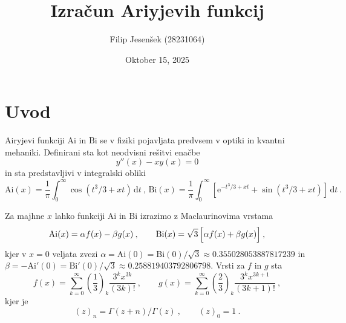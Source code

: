\documentclass{article}
\author{Filip Jesenšek (28231064)}
\date{Oktober 15, 2025}
\newcommand{\Ai}{\mathrm{Ai}}
\newcommand{\Bi}{\mathrm{Bi}}
\newcommand{\dd}{\,\mathrm{d}}
\theoremstyle{definition}
\theoremstyle{plain}
\numberwithin{definition}{section}
\numberwithin{theorem}{section} \title{Izračun Ariyjevih funkcij}
\begin{document}
\maketitle

\newpage

\tableofcontents

\newpage

\section{Uvod}

Airyjevi funkciji $\Ai$ in $\Bi$
se v fiziki pojavljata predvsem v optiki in kvantni mehaniki.  Definirani sta kot neodvisni rešitvi enačbe
%
\begin{equation*}
  y''(x) -xy(x) = 0
\end{equation*}
%
in sta predstavljivi v integralski obliki
%
\begin{equation*}
  \Ai(x) = \frac{1}{\pi} \int_0^\infty \cos (t^3/3 + x t) \dd t \>, \,
  \Bi(x) = \frac{1}{\pi} \int_0^\infty \left[ \mathrm{e}^{-t^3/3 + x t}
  + \sin (t^3/3 + x t) \right] \dd t \>.
\end{equation*}

Za majhne $x$ lahko funkciji $\Ai$ in $\Bi$ izrazimo
z Maclaurinovima vrstama
%
\begin{equation*}
  \Ai(x) = \alpha f(x) - \beta g(x)\>,\qquad
  \Bi(x) = \sqrt{3}\, \Bigl[\alpha f (x) + \beta g(x) \Bigr]\>,
\end{equation*}
kjer v $x=0$ veljata zvezi
%
$\alpha = \Ai(0) = \Bi(0)/\sqrt{3}\approx 0.355028053887817239$ in
$\beta = -\Ai'(0) = \Bi'(0)/\sqrt{3}\approx 0.258819403792806798$.
Vrsti za $f$ in $g$ sta
\begin{equation*}
  f(x) = \sum_{k=0}^\infty
  \left(\frac{1}{3}\right)_k \frac{3^k x^{3k}}{(3k)!} \>, \qquad
  g(x) = \sum_{k=0}^\infty
  \left(\frac{2}{3}\right)_k \frac{3^k x^{3k+1}}{(3k+1)!} \>,
\end{equation*}
kjer je
\begin{equation*}
  (z)_n = \Gamma(z+n)/\Gamma(z) \>, \qquad (z)_0 = 1 \>.
\end{equation*}
\end{document}
